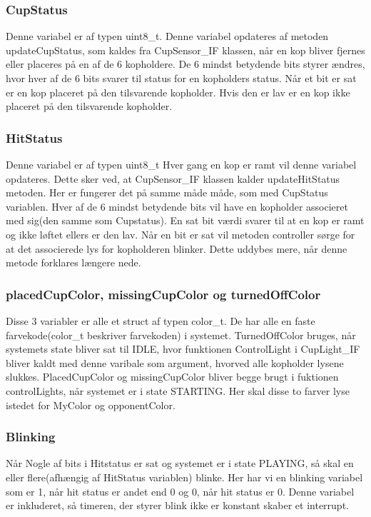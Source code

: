 \documentclass[Softwaredesign/Softwaredesign_main.tex]{subfiles}
\begin{document}
\subsubsection{CupStatus}
Denne variabel er af typen uint8\_t. Denne variabel opdateres af metoden updateCupStatus, som kaldes fra CupSensor\_IF klassen, når en kop bliver fjernes eller placeres på en af de 6 kopholdere. De 6 mindst betydende bits styrer ændres, hvor hver af de 6 bits svarer til status for en kopholders status. Når et bit er sat er en kop placeret på den tilsvarende kopholder. Hvis den er lav er en kop ikke placeret på den tilsvarende kopholder. 
\subsubsection{HitStatus}
Denne variabel er af typen uint8\_t Hver gang en kop er ramt vil denne variabel opdateres. Dette sker ved, at CupSensor\_IF klassen kalder updateHitStatus metoden. Her er fungerer det på samme måde måde, som med CupStatus variablen. Hver af de 6 mindst betydende bits vil have en kopholder associeret med sig(den samme som Cupstatus). En sat bit værdi svarer til at en kop er ramt og ikke løftet ellers er den lav. Når en bit er sat vil metoden controller sørge for at det associerede lys for kopholderen blinker. Dette uddybes mere, når denne metode forklares længere nede.
\subsubsection{placedCupColor, missingCupColor og turnedOffColor}
Disse 3 variabler er alle et struct af typen color\_t. De har alle en faste farvekode(color\_t beskriver farvekoden) i systemet. TurnedOffColor bruges, når systemets state bliver sat til IDLE, hvor funktionen ControlLight i CupLight\_IF bliver kaldt med denne varibale som argument, hvorved alle kopholder lysene slukkes. PlacedCupColor og missingCupColor bliver begge brugt i fuktionen controlLights, når systemet er i state STARTING. Her skal disse to farver lyse istedet for MyColor og opponentColor.
\subsubsection{Blinking}
Når Nogle af bits i Hitstatus er sat og systemet er i state PLAYING, så skal en eller flere(afhængig af HitStatus variablen) blinke. Her har vi en blinking variabel som er 1, når hit status er andet end 0 og 0, når hit status er 0. Denne variabel er inkluderet, så timeren, der styrer blink ikke er konstant skaber et interrupt.
\end{document}
